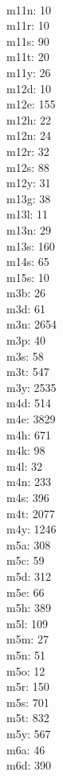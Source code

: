 \begin{multicols}{8}
  \\ m11n: 10
  \\ m11r: 10
  \\ m11s: 90
  \\ m11t: 20
  \\ m11y: 26
  \\ m12d: 10
  \\ m12e: 155
  \\ m12h: 22
  \\ m12n: 24
  \\ m12r: 32
  \\ m12s: 88
  \\ m12y: 31
  \\ m13g: 38
  \\ m13l: 11
  \\ m13n: 29
  \\ m13s: 160
  \\ m14s: 65
  \\ m15s: 10
  \\ m3b: 26
  \\ m3d: 61
  \\ m3n: 2654
  \\ m3p: 40
  \\ m3s: 58
  \\ m3t: 547
  \\ m3y: 2535
  \\ m4d: 514
  \\ m4e: 3829
  \\ m4h: 671
  \\ m4k: 98
  \\ m4l: 32
  \\ m4n: 233
  \\ m4s: 396
  \\ m4t: 2077
  \\ m4y: 1246
  \\ m5a: 308
  \\ m5c: 59
  \\ m5d: 312
  \\ m5e: 66
  \\ m5h: 389
  \\ m5l: 109
  \\ m5m: 27
  \\ m5n: 51
  \\ m5o: 12
  \\ m5r: 150
  \\ m5s: 701
  \\ m5t: 832
  \\ m5y: 567
  \\ m6a: 46
  \\ m6d: 390

\end{multicols}

